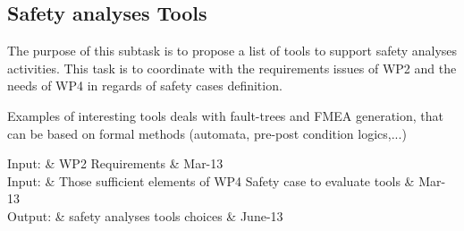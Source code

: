 \documentclass{template/openetcs_article}
\begin{document}
%
% 
%

\subsection{Safety analyses Tools}


The purpose of this subtask is to propose a list of tools to  support  safety  analyses activities. This task  is to  coordinate with  the requirements issues of WP2 and the needs of WP4 in regards of safety cases definition.

Examples of interesting tools deals with fault-trees and FMEA generation, that can be based on formal methods (automata, pre-post condition logics,...) 
  
 
\begin{inoutput}
Input: & WP2 Requirements & Mar-13 \\
Input: & Those sufficient elements of WP4 Safety case to evaluate tools & Mar-13 \\
\hline
Output: & safety analyses tools choices & June-13 \\
\end{inoutput}



\end{document}
